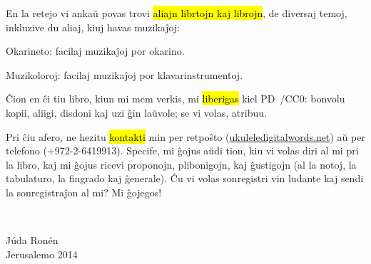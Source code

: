 En la retejo vi ankaŭ povas trovi \hl{aliajn librtojn kaj librojn}, de diversaj temoj, inkluzive du aliaj, kiuj havas muzikaĵoj:
\begin{compactitem}
	\item Okarineto: facilaj muzikaĵoj por okarino.
	\item Muzikoloroj: facilaj muzikaĵoj por klavarinstrumentoj.
\end{compactitem}

Ĉion en ĉi tiu libro, kiun mi mem verkis, mi \hl{liberigas} kiel PD~/CC0: bonvolu kopii, aliigi, disdoni kaj uzi ĝin laŭvole; se vi volas, atribuu.

Pri ĉiu afero, ne hezitu \hl{kontakti} min per retpoŝto ({\url{ukulele}\url{digitalwords.net}}) aŭ per telefono (\mbox{+972-2-6419913}). Specife, mi ĝojus aŭdi tion, kiu vi volas diri al mi pri la libro, kaj mi ĝojus ricevi proponojn, plibonigojn, kaj ĝustigojn (al la notoj, la tabulaturo, la fingrado kaj ĝenerale). Ĉu vi volas sonregistri vin ludante kaj sendi la sonregistraĵon al mi? Mi ĝojegos! 

\vspace{\baselineskip}
~\hfill
\begin{minipage}{3cm}
	Júda Ronén\\
	Jerusalemo 2014\\
\end{minipage}
